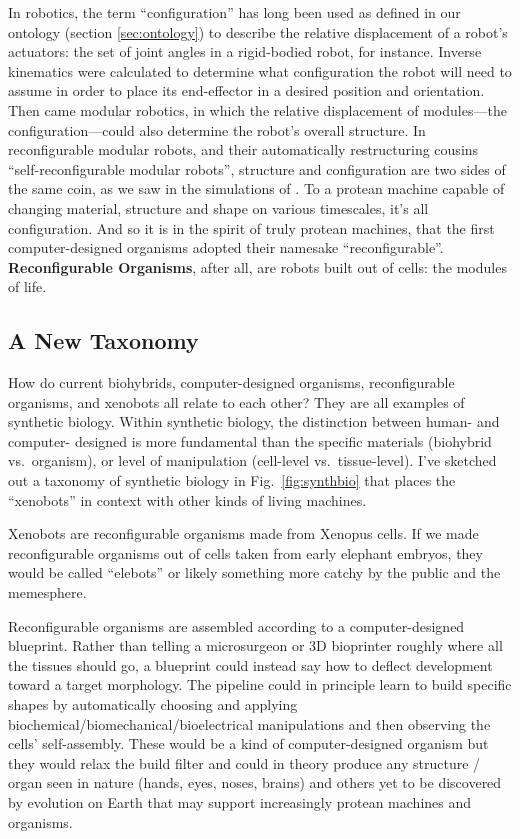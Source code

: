 In robotics, the term ``configuration'' has long been used
as defined in our ontology (section \ref{sec:ontology})
to describe the relative displacement of a robot's actuators: the set of joint angles in a rigid-bodied robot, for instance.
Inverse kinematics were calculated to determine what configuration the robot will need to assume in order to 
place its end-effector in a desired position and orientation.
Then came modular robotics, in which the relative displacement of modules---the configuration---could also determine the robot's overall structure.
In reconfigurable modular robots, and their automatically restructuring cousins ``self-reconfigurable modular robots'', structure and configuration are two sides of the same coin, as we saw in the simulations of \citet{pathak2019learning}.
To a protean machine capable of changing material, structure and shape on various timescales,
it's all configuration.
And so it is in the spirit of truly protean machines,
that the first computer-designed organisms
adopted their namesake ``reconfigurable''.
\textbf{Reconfigurable Organisms}, after all, are
robots built out of cells: the modules of life.


\subsection{A New Taxonomy}

How do current biohybrids,
computer-designed organisms,
reconfigurable organisms,
and xenobots
all relate to each other?
They are all examples of synthetic biology.
Within synthetic biology, the distinction between human- and computer- designed is more fundamental than the specific materials (biohybrid vs.~organism),
or level of manipulation (cell-level vs.~tissue-level).
I've sketched out a taxonomy of synthetic biology in  Fig.~\ref{fig:synthbio} that places the ``xenobots'' in context with other kinds of living machines.

Xenobots are reconfigurable organisms made from Xenopus cells.
If we made reconfigurable organisms out of cells taken from early elephant embryos, they would be called ``elebots'' or likely something more catchy by the public and the memesphere.

Reconfigurable organisms are assembled according to a computer-designed blueprint.
Rather than telling a microsurgeon or 3D bioprinter roughly where all the tissues should go, 
a blueprint could instead say how to deflect development toward a target morphology.
The pipeline could in principle learn to build specific shapes by automatically choosing and applying biochemical/biomechanical/bioelectrical
manipulations and then observing the cells' self-assembly.
These would be a kind of computer-designed organism but they would relax the build filter and could in theory produce any structure / organ seen in nature (hands, eyes, noses, brains) and others yet to be discovered by evolution on Earth that may support increasingly protean machines and organisms.


